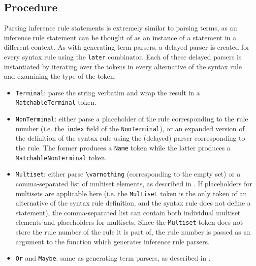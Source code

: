 \subsection{Procedure}
Parsing inference rule statements is extremely similar to parsing terms, as an inference rule statement can be thought of as an instance of a statement in a different context. As with generating term parsers, a delayed parser is created  for every syntax rule using the \lstinline{later} combinator. Each of these delayed parsers is instantiated by iterating over the tokens in every alternative of the syntax rule and examining the type of the token:
\begin{itemize}
    \item \lstinline{Terminal}: parse the string verbatim and wrap the result in a \lstinline{MatchableTerminal} token.
    \item \lstinline{NonTerminal}: either parse a placeholder of the rule corresponding to the rule number (i.e. the \lstinline{index} field of the \lstinline{NonTerminal}), or an expanded version of the definition of the syntax rule using the (delayed) parser corresponding to the rule. The former produces a \lstinline{Name} token while the latter produces a \lstinline{MatchableNonTerminal} token.
    \item \lstinline{Multiset}: either parse \lstinline{\varnothing} (corresponding to the empty set) or a comma-separated list of multiset elements, as described in . If placeholders for multisets are applicable here (i.e. the \lstinline{Multiset} token is the only token of an alternative of the syntax rule definition, and the syntax rule does not define a statement), the comma-separated list can contain both individual multiset elements and placeholders for multisets. Since the \lstinline{Multiset} token does not store the rule number of the rule it is part of, the rule number is passed as an argument to the function which generates inference rule parsers.
    \item \lstinline{Or} and \lstinline{Maybe}: same as generating term parsers, as described in .
\end{itemize}